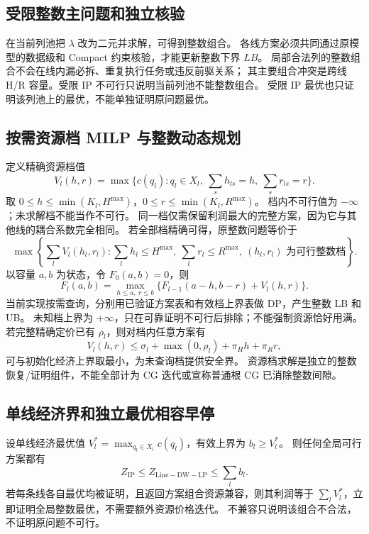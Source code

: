 \documentclass[UTF8,a4paper,11pt]{ctexart}
\newcommand{\IP}{\mathrm{IP}}
\begin{document}
\subsection{受限整数主问题和独立核验}
在当前列池把 $\lambda$ 改为二元并求解，可得到整数组合。
各线方案必须共同通过原模型的数据级和 Compact 约束核验，才能更新整数下界 $LB$。
局部合法列的整数组合不会在线内漏必拆、重复执行任务或违反前驱关系；
其主要组合冲突是跨线 H/R 容量。受限 IP 不可行只说明当前列池不能整数组合。
受限 IP 最优也只证明该列池上的最优，不能单独证明原问题最优。

\subsection{按需资源档 MILP 与整数动态规划}
定义精确资源档值
\begin{equation}
V_l(h,r)=\max\{c(q_l):q_l\in X_l,\ \sum_s h_{ls}=h,\ \sum_s r_{ls}=r\}.
\end{equation}
取 $0\leq h\leq\min(K_l,H^{\max})$，$0\leq r\leq\min(K_l,R^{\max})$。
档内不可行值为 $-\infty$；未求解档不能当作不可行。
同一档仅需保留利润最大的完整方案，因为它与其他线的耦合系数完全相同。
若全部档精确可得，原整数问题等价于
\begin{equation}
\max\left\{\sum_l V_l(h_l,r_l):\sum_lh_l\leq H^{\max},\
\sum_lr_l\leq R^{\max},\ (h_l,r_l)\text{ 为可行整数档}\right\}.
\end{equation}
以容量 $a,b$ 为状态，令 $F_0(a,b)=0$，则
\begin{equation}
F_l(a,b)=\max_{h\leq a,\ r\leq b}
\{F_{l-1}(a-h,b-r)+V_l(h,r)\}.
\end{equation}
当前实现按需查询，分别用已验证方案表和有效档上界表做 DP，产生整数 LB 和 UB。
未知档上界为 $+\infty$，只在可靠证明不可行后排除；不能强制资源恰好用满。
若完整精确定价已有 $\rho_l$，则对档内任意方案有
\begin{equation}
V_l(h,r)\leq\sigma_l+\max(0,\rho_l)+\pi_Hh+\pi_Rr,
\end{equation}
可与初始化经济上界取最小，为未查询档提供安全界。
资源档求解是独立的整数恢复/证明组件，不能全部计为 CG 迭代或宣称普通根 CG 已消除整数间隙。

\subsection{单线经济界和独立最优相容早停}
设单线经济最优值 $V_l^*=\max_{q_l\in X_l}c(q_l)$，有效上界为 $b_l\geq V_l^*$。
则任何全局可行方案都有
\begin{equation}
Z_{\IP}\leq Z_{\mathrm{Line-DW-LP}}\leq\sum_l b_l.\label{eq:econ}
\end{equation}
若每条线各自最优均被证明，且返回方案组合资源兼容，则其利润等于
$\sum_lV_l^*$，立即证明全局整数最优，不需要额外资源价格迭代。
不兼容只说明该组合不合法，不证明原问题不可行。
\end{document}
